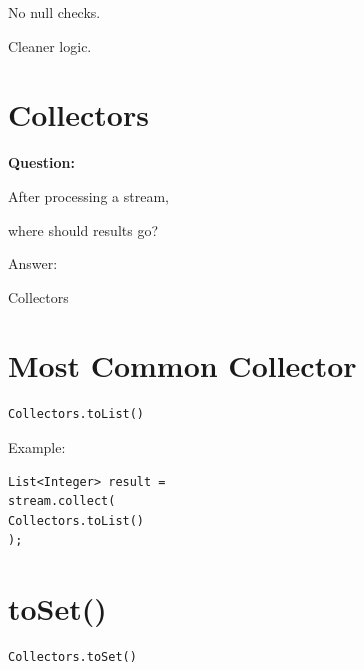 \documentclass[11pt,a4paper]{book}
\begin{document}

No null checks.


Cleaner logic.


\section{Collectors}

\textbf{Question:}


After processing a stream,

where should results go?


Answer:


Collectors


\section{Most Common Collector}

\begin{verbatim} 
Collectors.toList()
\end{verbatim}


Example:

\begin{verbatim} 
List<Integer> result =
stream.collect(
Collectors.toList()
);
\end{verbatim}


\section{toSet()}

\begin{verbatim} 
Collectors.toSet()
\end{verbatim}
\end{document}
